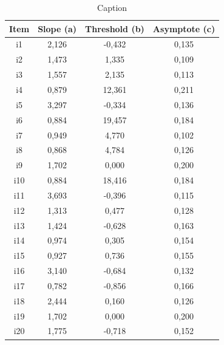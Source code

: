    \begin{table}[!h]
       \centering
       \begin{tabular}{c|c|c|c}
            \hline
            Item &	Slope (a) &	Threshold (b)&	Asymptote (c)\\
            \hline
            \hline
            i1 &	2,126 &	-0,432 & 0,135 \\
            \hline
            i2 &	1,473 &	1,335 &	0,109 \\
            \hline
            i3 &	1,557 &	2,135 &	0,113 \\
            \hline
            i4 &	0,879 &	12,361 &	0,211 \\
            \hline
            i5 &	3,297 &	-0,334 &	0,136 \\
            \hline
            i6 &	0,884 &	19,457 & 0,184 \\
            \hline
            i7 &	0,949 &	4,770 &	0,102 \\
            \hline
            i8 &	0,868 &	4,784 &	0,126 \\
            \hline
            i9 &	1,702 &	0,000 &	0,200 \\ 
            \hline
            i10 &	0,884 &	18,416 &	0,184 \\
            \hline
            i11 &	3,693 &	-0,396 & 0,115 \\
            \hline
            i12 &	1,313 &	0,477 &	0,128 \\
            \hline
            i13 &	1,424 &	-0,628 &	0,163 \\
            \hline
            i14 &	0,974 &	0,305 & 0,154 \\
            \hline
            i15 &	0,927 &	0,736 &	0,155 \\
            \hline
            i16 &	3,140 &	-0,684 &	0,132 \\
            \hline
            i17 &	0,782 &	-0,856 &	0,166 \\
            \hline
            i18 &	2,444 &	0,160 &	0,126 \\
            \hline
            i19 &	1,702 &	0,000 &	0,200 \\
            \hline
            i20 &	1,775 &	-0,718 &	0,152 \\
            \hline
       \end{tabular}
       \caption{Caption}
       \label{tab:my_label}
   \end{table}
   
